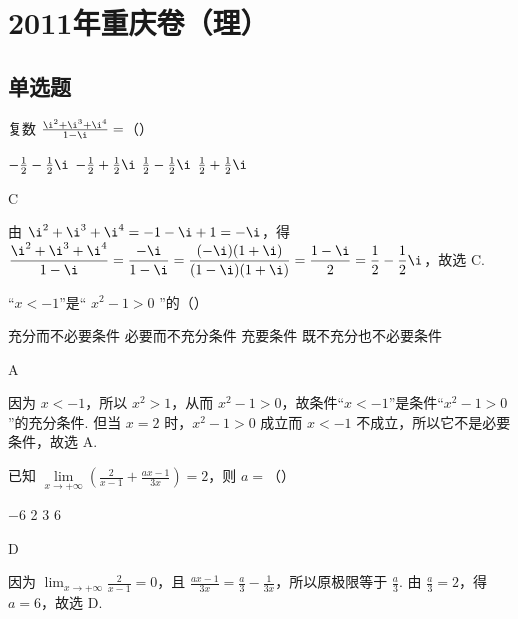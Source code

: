 \chapter{2011年重庆卷（理）}

\section{单选题}

\begin{problem}
复数 \(\frac{\i^2 + \i^3 + \i^4}{1 - \i} =\)（\quad）

\choices
    {\(-\frac{1}{2} - \frac{1}{2}\i\)}
    {\(-\frac{1}{2} + \frac{1}{2}\i\)}
    {\(\frac{1}{2} - \frac{1}{2}\i\)}
    {\(\frac{1}{2} + \frac{1}{2}\i\)}
\begin{answer}
C
\end{answer}

\begin{solution}
由 \(\i^2+\i^3+\i^4=-1-\i+1=-\i\)，得
\(\displaystyle\frac{\i^2+\i^3+\i^4}{1-\i}=\frac{-\i}{1-\i}=\frac{(-\i)(1+\i)}{(1-\i)(1+\i)}=\frac{1-\i}{2}=\frac{1}{2}-\frac{1}{2}\i\)，故选 C.
\end{solution}
\end{problem}

\begin{problem}
“\(x < -1\)”是“ \( x^{2} - 1 > 0 \) ”的（\quad）

\choices
    {充分而不必要条件}
    {必要而不充分条件}
    {充要条件}
    {既不充分也不必要条件}
\begin{answer}
A
\end{answer}

\begin{solution}
因为 \(x<-1\)，所以 \(x^2>1\)，从而 \(x^2-1>0\)，故条件“\(x<-1\)”是条件“\(x^2-1>0\)”的充分条件. 但当 \(x=2\) 时，\(x^2-1>0\) 成立而 \(x<-1\) 不成立，所以它不是必要条件，故选 A.
\end{solution}
\end{problem}

\begin{problem}
已知 \(\lim\limits_{x\to +\infty}\left(\frac{2}{x - 1} + \frac{ax - 1}{3x}\right) = 2\)，则 \(a =\)（\quad）

\choices
    {\(-6\)}
    {2}
    {3}
    {6}
\begin{answer}
D
\end{answer}

\begin{solution}
因为 \(\displaystyle\lim_{x\to+\infty}\frac{2}{x-1}=0\)，且
\(\displaystyle\frac{ax-1}{3x}=\frac{a}{3}-\frac{1}{3x}\)，所以原极限等于 \(\frac{a}{3}\). 由 \(\frac{a}{3}=2\)，得 \(a=6\)，故选 D.
\end{solution}
\end{problem}


